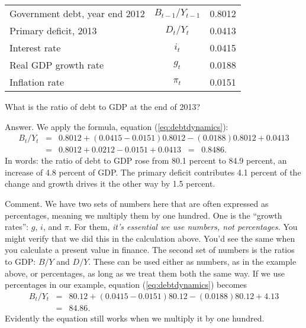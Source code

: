 \begin{center}
\begin{tabular}{lcr}
\toprule
%
Government debt, year end 2012  &  $B_{t-1}/Y_{t-1}$ & 0.8012 \\
Primary deficit, 2013           &  $D_t/Y_t$         & 0.0413 \\
Interest rate                   &  $i_t$             & 0.0415 \\
Real GDP growth rate            &  $g_t$             & 0.0188 \\
Inflation rate                  &  $\pi_t$           & 0.0151 \\
\bottomrule
\end{tabular}
\end{center}

What is the ratio of debt to GDP at the end of 2013?

Answer.  We apply the formula, equation (\ref{eq:debtdynamics}):
\begin{eqnarray*}
    {B_{t}}/{Y_{t}} &=&  0.8012  + (0.0415-0.0151) 0.8012 - (0.0188) 0.8012 + 0.0413 \\
            &=&  0.8012 + 0.0212 - 0.0151 + 0.0413 \;\;=\;\; 0.8486.
\end{eqnarray*}
In words:  the ratio of debt to GDP rose from 80.1 percent to 84.9 percent,
an increase of 4.8 percent of GDP.
The primary deficit contributes 4.1 percent of the change
and growth drives it the other way by 1.5 percent.

Comment.  We have two sets of numbers here that are often expressed
as percentages, meaning we multiply them by one hundred.
One is the ``growth rates'':  $g$, $i$, and $\pi$.
For them, {\it it's essential we use numbers, not percentages.\/}
You might verify that we did this in the calculation above.
You'd see the same when you calculate a present value in finance.
The second set of numbers is the ratios to GDP:  $B/Y$ and $D/Y$.
These can be used either as numbers, as in the example above, or percentages,
as long as we treat them both the same way.
If we use percentages in our example,
equation (\ref{eq:debtdynamics}) becomes
\begin{eqnarray*}
    {B_{t}}/{Y_{t}} &=&  80.12  + (0.0415-0.0151) 80.12 - (0.0188) 80.12 + 4.13 \\
            &=&  84.86.
\end{eqnarray*}
Evidently the equation still works when we multiply it by one hundred.




